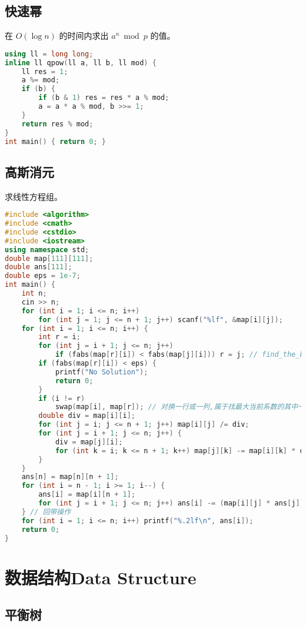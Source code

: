 \documentclass[9pt, a4paper, oneside]{book}
\begin{document}
\section{快速幂}
在 $O(\log n)$ 的时间内求出 $a^n \bmod p$ 的值。
\begin{lstlisting}[language={C++}]
using ll = long long;
inline ll qpow(ll a, ll b, ll mod) {
    ll res = 1;
    a %= mod;
    if (b) {
        if (b & 1) res = res * a % mod;
        a = a * a % mod, b >>= 1;
    }
    return res % mod;
}
int main() { return 0; }\end{lstlisting}
\section{高斯消元}
求线性方程组。
\begin{lstlisting}[language={C++}]
#include <algorithm>
#include <cmath>
#include <cstdio>
#include <iostream>
using namespace std;
double map[111][111];
double ans[111];
double eps = 1e-7;
int main() {
    int n;
    cin >> n;
    for (int i = 1; i <= n; i++)
        for (int j = 1; j <= n + 1; j++) scanf("%lf", &map[i][j]);
    for (int i = 1; i <= n; i++) {
        int r = i;
        for (int j = i + 1; j <= n; j++)
            if (fabs(map[r][i]) < fabs(map[j][i])) r = j; // find_the_biggest_number_of_the_first_column（at present)
        if (fabs(map[r][i]) < eps) {
            printf("No Solution");
            return 0;
        }
        if (i != r)
            swap(map[i], map[r]); // 对换一行或一列,属于找最大当前系数的其中一步。（这样就可以只处理当前行的系数啦！）
        double div = map[i][i];
        for (int j = i; j <= n + 1; j++) map[i][j] /= div;
        for (int j = i + 1; j <= n; j++) {
            div = map[j][i];
            for (int k = i; k <= n + 1; k++) map[j][k] -= map[i][k] * div;
        }
    }
    ans[n] = map[n][n + 1];
    for (int i = n - 1; i >= 1; i--) {
        ans[i] = map[i][n + 1];
        for (int j = i + 1; j <= n; j++) ans[i] -= (map[i][j] * ans[j]);
    } // 回带操作
    for (int i = 1; i <= n; i++) printf("%.2lf\n", ans[i]);
    return 0;
}\end{lstlisting}
\chapter{数据结构Data Structure}
\section{平衡树}
\end{document}
